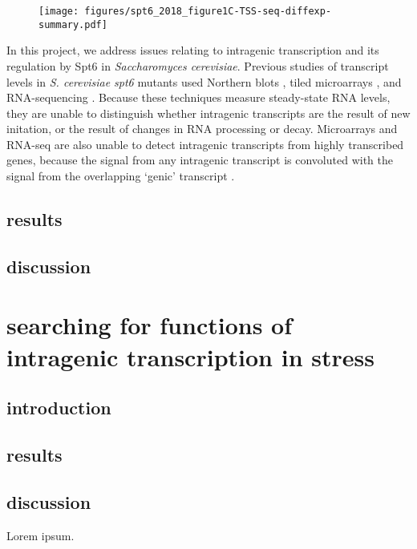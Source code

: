 \documentclass[11pt, a4paper]{article}
\begin{document}
\begin{figure}[h]
\centering
\texttt{[image: figures/spt6\_2018\_figure1C-TSS-seq-diffexp-summary.pdf]}
\end{figure}

In this project, we address issues relating to intragenic transcription and its regulation by Spt6 in \textit{Saccharomyces cerevisiae}. Previous studies of transcript levels in \textit{S. cerevisiae spt6} mutants used Northern blots \cite{kaplan2003}, tiled microarrays \cite{cheung2008}, and RNA-sequencing \cite{uwimana2017}. Because these techniques measure steady-state RNA levels, they are unable to distinguish whether intragenic transcripts are the result of new initation, or the result of changes in RNA processing or decay. Microarrays and RNA-seq are also unable to detect intragenic transcripts from highly transcribed genes, because the signal from any intragenic transcript is convoluted with the signal from the overlapping `genic' transcript \cite{cheung2008, lickwar2009}.

\subsection{results}
\subsection{discussion}

\section{searching for functions of intragenic transcription in stress}
\subsection{introduction}
\subsection{results}
\subsection{discussion}

Lorem ipsum.

\printbibliography
\end{document}
